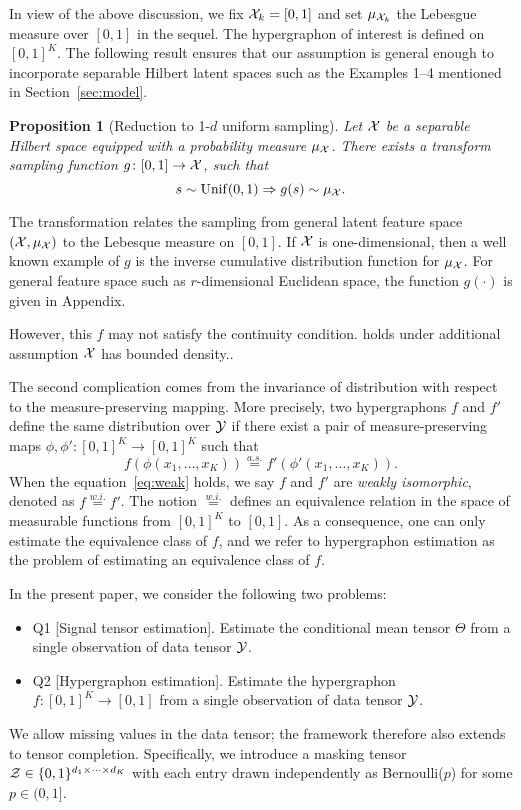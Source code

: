 \documentclass{article}
\theoremstyle{plain}
\newtheorem{prop}{Proposition}
\theoremstyle{definition}
\begin{document}
In view of the above discussion, we fix $\mathcal{X}_k=[0,1]$ and set $\mu_{\mathcal{X}_k}$ the Lebesgue measure over $[0,1]$ in the sequel. The hypergraphon of interest is defined on $[0,1]^K$. The following result ensures that our assumption is general enough to incorporate separable Hilbert latent spaces such as the Examples 1--4 mentioned in Section~\eqref{sec:model}.
\begin{prop}[Reduction to 1-$d$ uniform sampling] Let $\mathcal{X}$ be a separable Hilbert space equipped with a probability measure $\mu_{\mathcal{X}}$.  There exists a transform sampling function $g\colon[0,1]\to \mathcal{X}$, such that 
\[
s\sim \mathrm{Unif}(0,1) \Rightarrow g(s)\sim \mu_{\mathcal{X}}.
\]
\end{prop}
The transformation relates the sampling from general latent feature space $(\mathcal{X}, \mu_{\mathcal{X}})$ to the Lebesque measure on $[0,1]$. If $\mathcal{X}$ is one-dimensional, then a well known example of $g$ is the inverse cumulative distribution function for $\mu_{\mathcal{X}}$. For general feature space such as $r$-dimensional Euclidean space, the function $g(\cdot)$ is given in Appendix. 

{\color{red} However, this $f$ may not satisfy the continuity condition. holds under additional assumption $\mathcal{X}$ has bounded density.. }

The second complication comes from the invariance of distribution with respect to the measure-preserving mapping. More precisely, two hypergraphons $f$ and $f'$ define the same distribution over $\mathcal{Y}$ if there exist a pair of measure-preserving maps $\phi, \phi' \colon[0,1]^K\to[0,1]^K$ such that
\begin{equation}\label{eq:weak}
f(\phi(x_1,\ldots,x_K))\stackrel{a.s.}{=}f'(\phi'(x_1,\ldots,x_K)).
\end{equation}
When the equation~\eqref{eq:weak} holds, we say $f$ and $f'$ are {\it weakly isomorphic}, denoted as $f\stackrel{w.i.}{=}f'$. The notion $\stackrel{w.i.}{=}$ defines an equivalence relation in the space of measurable functions from $[0,1]^K$ to $[0,1]$. 
As a consequence, one can only estimate the equivalence class of $f$, and we refer to hypergraphon estimation as the problem of estimating an equivalence class of $f$.  

In the present paper, we consider the following two problems:
\begin{itemize}[leftmargin=*]
\item Q1 [Signal tensor estimation]. Estimate the conditional mean tensor $\Theta$ from a single observation of data tensor $\mathcal{Y}$.
\item Q2 [Hypergraphon estimation]. Estimate the hypergraphon $f\colon [0,1]^K\to [0,1]$ from a single observation of data tensor $\mathcal{Y}$.
\end{itemize}
We allow missing values in the data tensor; the framework therefore also extends to tensor completion. Specifically, we introduce a masking tensor $\mathcal{Z}\in\{0,1\}^{d_1\times \cdots \times d_K}$ with each entry drawn independently as Bernoulli($p$) for some $p\in(0,1]$. 
\end{document}
